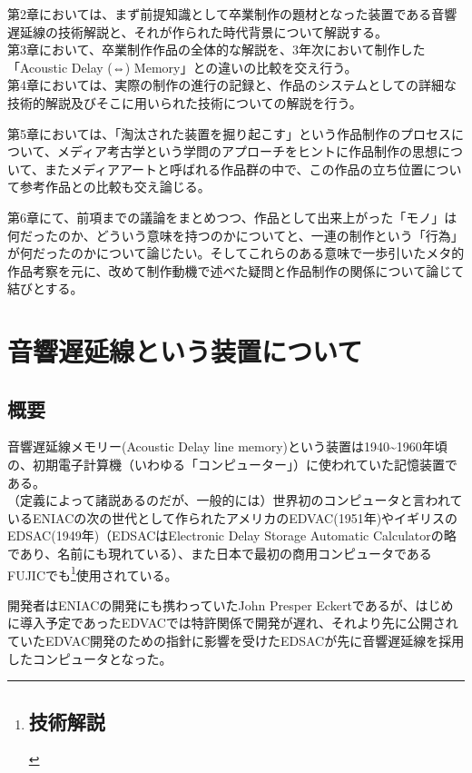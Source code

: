 第2章においては、まず前提知識として卒業制作の題材となった装置である音響遅延線の技術解説と、それが作られた時代背景について解説する。\\
第3章において、卒業制作作品の全体的な解説を、3年次において制作した「Acoustic
Delay (⇔) Memory」との違いの比較を交え行う。\\
第4章においては、実際の制作の進行の記録と、作品のシステムとしての詳細な技術的解説及びそこに用いられた技術についての解説を行う。

第5章においては、「淘汰された装置を掘り起こす」という作品制作のプロセスについて、メディア考古学という学問のアプローチをヒントに作品制作の思想について、またメディアアートと呼ばれる作品群の中で、この作品の立ち位置について参考作品との比較も交え論じる。

第6章にて、前項までの議論をまとめつつ、作品として出来上がった「モノ」は何だったのか、どういう意味を持つのかについてと、一連の制作という「行為」が何だったのかについて論じたい。そしてこれらのある意味で一歩引いたメタ的作品考察を元に、改めて制作動機で述べた疑問と作品制作の関係について論じて結びとする。

\chapter{音響遅延線という装置について}\label{ux97f3ux97ffux9045ux5ef6ux7ddaux3068ux3044ux3046ux88c5ux7f6eux306bux3064ux3044ux3066}

\section{概要}\label{ux6982ux8981}

音響遅延線メモリー(Acoustic Delay line
memory)という装置は1940\textasciitilde{}1960年頃の、初期電子計算機（いわゆる「コンピューター」）に使われていた記憶装置である。\\
（定義によって諸説あるのだが、一般的には）世界初のコンピュータと言われているENIACの次の世代として作られたアメリカのEDVAC(1951年)やイギリスのEDSAC(1949年)（EDSACはElectronic
Delay Storage Automatic
Calculatorの略であり、名前にも現れている）、また日本で最初の商用コンピュータであるFUJICでも\footnote{\section{技術解説}\label{ux6280ux8853ux89e3ux8aac}}使用されている。

開発者はENIACの開発にも携わっていたJohn Presper
Eckertであるが、はじめに導入予定であったEDVACでは特許関係で開発が遅れ、それより先に公開されていたEDVAC開発のための指針に影響を受けたEDSACが先に音響遅延線を採用したコンピュータとなった。


